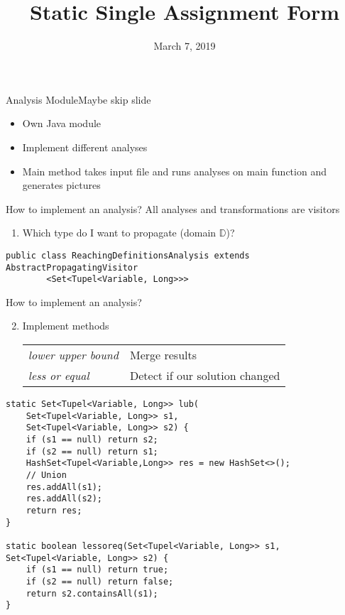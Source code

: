 \documentclass[xcolor={usenames,dvipsnames}, aspectratio=169, 12pt]{beamer}
\title[Program Optimization]{Static Single Assignment Form}
\date{March 7, 2019}
\institute{Technische Universität München}
\begin{document}
\frame[plain]{\titlepage}

\begin{frame}{Analysis Module}{Maybe skip slide}
\begin{itemize}
	\item Own Java module
	\item Implement different analyses
	\item Main method takes input file and runs analyses on main function and generates pictures
\end{itemize}
\end{frame}

\begin{frame}[fragile]{How to implement an analysis?}
All analyses and transformations are visitors
\begin{enumerate}
	\item Which type do I want to propagate (domain $\mathbb{D}$)?
\end{enumerate}

\begin{lstlisting}
public class ReachingDefinitionsAnalysis extends AbstractPropagatingVisitor
		<Set<Tupel<Variable, Long>>>
\end{lstlisting}
\end{frame}

\begin{frame}[fragile]{How to implement an analysis?}
\begin{enumerate}
	\setcounter{enumi}{1}
	\item Implement methods\\
	\begin{tabular}{ll}
		\emph{lower upper bound} & Merge results\\
		\emph{less or equal} & Detect if our solution changed\\
	\end{tabular}
\end{enumerate}

\vspace{-0.3cm}
\begin{lstlisting}
static Set<Tupel<Variable, Long>> lub(
	Set<Tupel<Variable, Long>> s1,
	Set<Tupel<Variable, Long>> s2) {
    if (s1 == null) return s2;
    if (s2 == null) return s1;
    HashSet<Tupel<Variable,Long>> res = new HashSet<>();
    // Union
    res.addAll(s1);
    res.addAll(s2);
    return res;
}

static boolean lessoreq(Set<Tupel<Variable, Long>> s1, Set<Tupel<Variable, Long>> s2) {
    if (s1 == null) return true;
    if (s2 == null) return false;
    return s2.containsAll(s1);
}
\end{lstlisting}
\end{frame}
\end{document}
